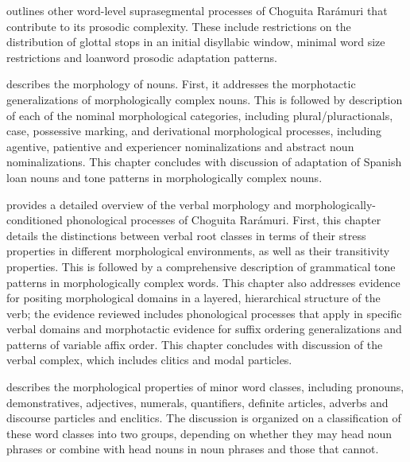 \medskip

\noindent \textbf{} outlines other word-level suprasegmental processes of Choguita Rarámuri that contribute to its prosodic complexity. These include restrictions on the distribution of glottal stops in an initial disyllabic window, minimal word size restrictions and loanword prosodic adaptation patterns.

\medskip

\noindent \textbf{} describes the morphology of nouns. First, it addresses the morphotactic generalizations of morphologically complex nouns. This is followed by description of each of the nominal morphological categories, including plural\slash pluractionals, case, possessive marking, and derivational morphological proces\-ses, including agentive, patientive and experiencer nominalizations and abstract noun nominalizations. This chapter concludes with discussion of adaptation of {Spanish} loan nouns and tone patterns in morphologically complex nouns.

\medskip

\noindent \textbf{} provides a detailed overview of the verbal morphology and morphol\-o\-gic\-ally-conditioned phonological processes of Choguita Rarámuri. First, this chapter details the distinctions between verbal root classes in terms of their stress properties in different morphological environments, as well as their transitivity properties. This is followed by a comprehensive description of grammatical tone patterns in morphologically complex words. This chapter also addresses evidence for positing morphological domains in a layered, hierarchical structure of the verb; the evidence reviewed includes phonological processes that apply in specific verbal domains and morphotactic evidence for suffix ordering generalizations and patterns of variable affix order. This chapter concludes with discussion of the verbal complex, which includes clitics and modal particles.

\medskip

\noindent \textbf{} describes the morphological properties of minor word classes, including pronouns, demonstratives, adjectives, numerals, quantifiers, definite articles, adverbs and discourse particles and enclitics. The discussion is organized on a classification of these word classes into two groups, depending on whether they may head noun phrases or combine with head nouns in noun phrases and those that cannot.


